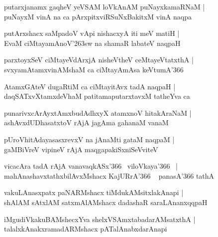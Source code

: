 \documentclass[twoside,12pt,openright]{book}
\def\S{\char'263}
\newcounter{shloka}[chapter]
\begin{document}
\begin{shloka}%
putarxjanamx gaqheV yeVSAM loVkAnAM puNayxkamaRNaM |\\
puNayxM vinA na ca pArxpitxviRSuNxBakitxM vinA naqpa
\end{shloka}

\begin{shloka}%
putArxshacx saMpadoV vApi nishacxyA iti meV matiH |\\
EvaM ciMtayamAnoV\S sw na shamaR labateV naqpaH 
\end{shloka}

\begin{shloka}%
parxtoyxSeV ciMtayeVdArxjA nisheVtheV ceMtayeVtatxthA |\\
svxyamAtamxvinAMshaM ca ciMtayAmAsa keVtumA\char'366
\end{shloka}

\begin{shloka}%
AtamxGAteV dugaRtiM ca ciMtayitAvx tadA naqpaH |\\
daqSATxvXtamxdeVhaM patitamaputarxtavxM tatheYva ca 
\end{shloka}

\begin{shloka}%
punarivxcArAyxtAmxbudAdhxyX atamxnoV hitakAraNaM |\\
ashAvxdUDhasatxtoV rAjA jagAma gahanaM vanaM
\end{shloka}

\begin{shloka}%
pUroVhitAdayasasxrevxV na jAnaMti gataM naqpaM |\\
gaMBiVreV vipineV rAjA maqgapakiSxniSeVviteV
\end{shloka}

\begin{shloka}%
vicacAra tadA rAjA vanavaqkASx\char'366 ~viloVkaya\char'366 ~|
mahAnashavxtathxbilAvxMshacx KajURrA\char'366 ~ panasA\char'366 tathA
\end{shloka}

\begin{shloka}%
vakuLAnasxpatx paNARMshacx tiMdukAMsitxlakAnapi |\\
shAlAM sAtxlAM satxmAlAMshacx dadashaR saraLAnanxqqpaH 
\end{shloka}

\begin{shloka}%
iMgudiVkakuBAMshecxYva shelxVSAmxtabadarAMsatxthA |\\
talalxkAnakxramadARMshacx pATalAnabxdarAnapi
\end{shloka}
\end{document}

